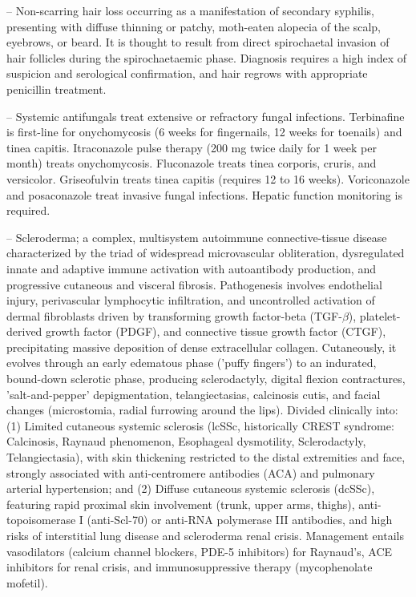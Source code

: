 -- Non-scarring hair loss occurring as a manifestation of secondary syphilis, presenting with diffuse thinning or patchy, moth-eaten alopecia of the scalp, eyebrows, or beard. It is thought to result from direct spirochaetal invasion of hair follicles during the spirochaetaemic phase. Diagnosis requires a high index of suspicion and serological confirmation, and hair regrows with appropriate penicillin treatment.

-- Systemic antifungals treat extensive or refractory fungal infections. Terbinafine is first-line for onychomycosis (6 weeks for fingernails, 12 weeks for toenails) and tinea capitis. Itraconazole pulse therapy (200 mg twice daily for 1 week per month) treats onychomycosis. Fluconazole treats tinea corporis, cruris, and versicolor. Griseofulvin treats tinea capitis (requires 12 to 16 weeks). Voriconazole and posaconazole treat invasive fungal infections. Hepatic function monitoring is required.

-- Scleroderma; a complex, multisystem autoimmune connective-tissue disease characterized by the triad of widespread microvascular obliteration, dysregulated innate and adaptive immune activation with autoantibody production, and progressive cutaneous and visceral fibrosis. Pathogenesis involves endothelial injury, perivascular lymphocytic infiltration, and uncontrolled activation of dermal fibroblasts driven by transforming growth factor-beta (TGF-$\beta$), platelet-derived growth factor (PDGF), and connective tissue growth factor (CTGF), precipitating massive deposition of dense extracellular collagen. Cutaneously, it evolves through an early edematous phase ('puffy fingers') to an indurated, bound-down sclerotic phase, producing sclerodactyly, digital flexion contractures, 'salt-and-pepper' depigmentation, telangiectasias, calcinosis cutis, and facial changes (microstomia, radial furrowing around the lips). Divided clinically into: (1) Limited cutaneous systemic sclerosis (lcSSc, historically CREST syndrome: Calcinosis, Raynaud phenomenon, Esophageal dysmotility, Sclerodactyly, Telangiectasia), with skin thickening restricted to the distal extremities and face, strongly associated with anti-centromere antibodies (ACA) and pulmonary arterial hypertension; and (2) Diffuse cutaneous systemic sclerosis (dcSSc), featuring rapid proximal skin involvement (trunk, upper arms, thighs), anti-topoisomerase I (anti-Scl-70) or anti-RNA polymerase III antibodies, and high risks of interstitial lung disease and scleroderma renal crisis. Management entails vasodilators (calcium channel blockers, PDE-5 inhibitors) for Raynaud's, ACE inhibitors for renal crisis, and immunosuppressive therapy (mycophenolate mofetil).


